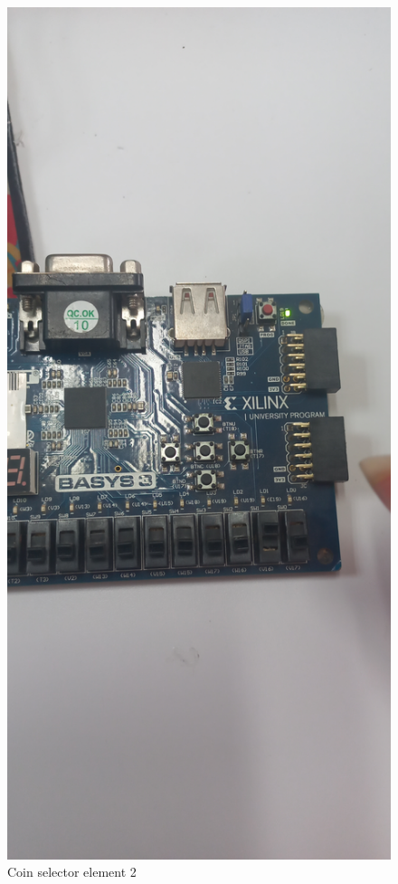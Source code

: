 \documentclass{article}
\begin{document}
\begin{multicols}{2}
	\begin{figure}[H]
		\centering
		\includegraphics[width=1\linewidth]{images/diagrams/coin-selector/coin-selector2.jpg}
		\caption{Coin selector element 2}
		\label{Coin selector element 2 Apendix}
	\end{figure}


\end{multicols}
\end{document}
